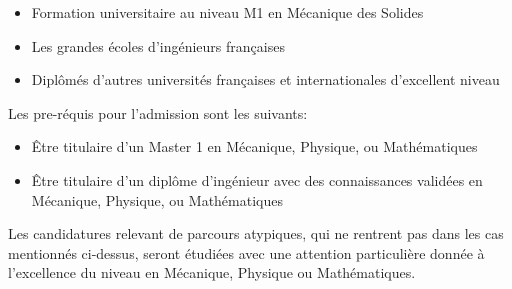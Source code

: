\documentclass[french,11pt]{article}
\begin{document}
\begin{itemize}
\item
  Formation universitaire au niveau M1 en Mécanique des Solides 
\item
  Les grandes écoles d'ingénieurs françaises
\item
  Diplômés d'autres universités françaises et internationales
  d'excellent niveau
\end{itemize}
Les pre-réquis pour l’admission sont les suivants:
\begin{itemize}
\item
  Être titulaire d'un Master 1 en Mécanique, Physique, ou Mathématiques
\item
  Être titulaire d'un diplôme d'ingénieur avec des connaissances
  validées en Mécanique, Physique, ou Mathématiques
\end{itemize}
Les candidatures relevant de parcours atypiques, qui ne rentrent pas dans les cas 
mentionnés ci-dessus, seront étudiées avec une attention particulière donnée à l'excellence du niveau en Mécanique, Physique ou Mathématiques.
\end{document}
